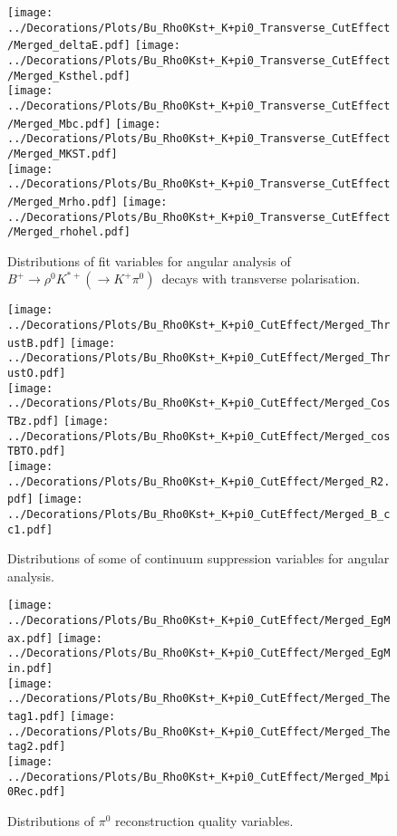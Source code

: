 \begin{figure}[p]
\centering
\texttt{[image: ../Decorations/Plots/Bu\_Rho0Kst+\_K+pi0\_Transverse\_CutEffect/Merged\_deltaE.pdf]}\hfil
\texttt{[image: ../Decorations/Plots/Bu\_Rho0Kst+\_K+pi0\_Transverse\_CutEffect/Merged\_Ksthel.pdf]}\\
\texttt{[image: ../Decorations/Plots/Bu\_Rho0Kst+\_K+pi0\_Transverse\_CutEffect/Merged\_Mbc.pdf]}\hfil
\texttt{[image: ../Decorations/Plots/Bu\_Rho0Kst+\_K+pi0\_Transverse\_CutEffect/Merged\_MKST.pdf]}\\
\texttt{[image: ../Decorations/Plots/Bu\_Rho0Kst+\_K+pi0\_Transverse\_CutEffect/Merged\_Mrho.pdf]}\hfil
\texttt{[image: ../Decorations/Plots/Bu\_Rho0Kst+\_K+pi0\_Transverse\_CutEffect/Merged\_rhohel.pdf]}\\
\caption{Distributions of fit variables for angular analysis of $B^+\to\rho^0K^{*+}(\to K^+\pi^0)$\ decays with transverse polarisation.}
\end{figure}
\clearpage
\begin{figure}[p]
\centering

\texttt{[image: ../Decorations/Plots/Bu\_Rho0Kst+\_K+pi0\_CutEffect/Merged\_ThrustB.pdf]}\hfil
\texttt{[image: ../Decorations/Plots/Bu\_Rho0Kst+\_K+pi0\_CutEffect/Merged\_ThrustO.pdf]}\\
\texttt{[image: ../Decorations/Plots/Bu\_Rho0Kst+\_K+pi0\_CutEffect/Merged\_CosTBz.pdf]}\hfil
\texttt{[image: ../Decorations/Plots/Bu\_Rho0Kst+\_K+pi0\_CutEffect/Merged\_cosTBTO.pdf]}\\
\texttt{[image: ../Decorations/Plots/Bu\_Rho0Kst+\_K+pi0\_CutEffect/Merged\_R2.pdf]}\hfil
\texttt{[image: ../Decorations/Plots/Bu\_Rho0Kst+\_K+pi0\_CutEffect/Merged\_B\_cc1.pdf]}\\
\caption{Distributions of some of continuum suppression variables for angular analysis.}
\end{figure}
\clearpage
\begin{figure}[p]
\centering
\texttt{[image: ../Decorations/Plots/Bu\_Rho0Kst+\_K+pi0\_CutEffect/Merged\_EgMax.pdf]}\hfil
\texttt{[image: ../Decorations/Plots/Bu\_Rho0Kst+\_K+pi0\_CutEffect/Merged\_EgMin.pdf]}\\
\texttt{[image: ../Decorations/Plots/Bu\_Rho0Kst+\_K+pi0\_CutEffect/Merged\_Thetag1.pdf]}\hfil
\texttt{[image: ../Decorations/Plots/Bu\_Rho0Kst+\_K+pi0\_CutEffect/Merged\_Thetag2.pdf]}\\
\texttt{[image: ../Decorations/Plots/Bu\_Rho0Kst+\_K+pi0\_CutEffect/Merged\_Mpi0Rec.pdf]}\\
\caption{Distributions of $\pi^0$ reconstruction quality variables.}
\end{figure}
